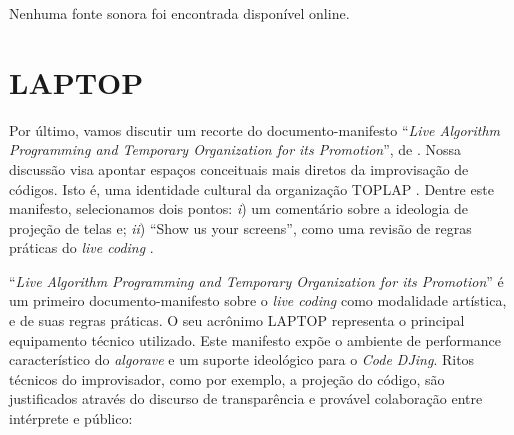 Nenhuma fonte sonora foi encontrada disponível online. 

\section{LAPTOP}\label{sec:laptoptoplap}

Por último, vamos discutir um recorte do documento-manifesto ``\emph{Live Algorithm Programming and Temporary Organization for its Promotion}'', de . Nossa discussão visa apontar espaços conceituais mais diretos da improvisação de códigos. Isto é, uma identidade cultural da organização TOPLAP .  Dentre este manifesto, selecionamos dois pontos: \emph{i}) um comentário sobre a ideologia de projeção de telas  e; \emph{ii}) ``Show us your screens'', como uma revisão de regras práticas do \emph{live coding} .

``\emph{Live Algorithm Programming and Temporary Organization for its Promotion}'' \cite{ward_live_2004,blackwell_programming_2005} é um primeiro documento-manifesto sobre o \emph{live coding} como modalidade artística, e de suas regras práticas. O seu acrônimo LAPTOP representa o principal equipamento técnico utilizado. Este manifesto expõe o ambiente de performance característico do \emph{algorave} e um suporte ideológico para o \emph{Code DJing}. Ritos técnicos do improvisador, como por exemplo, a projeção do código, são justificados através do discurso de transparência e provável colaboração entre intérprete e público:


